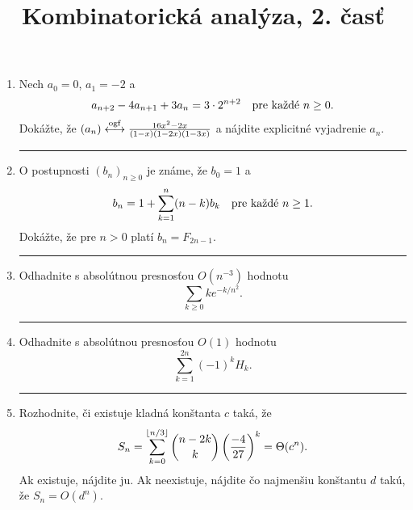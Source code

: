\documentclass[a4paper, 12pt]{article}
\title{Kombinatorická analýza, 2. časť}
\date{}
\def\ogf{\overset{{\rm ogf}}{\longleftrightarrow}}
\begin{document}
\begin{enumerate}
\item
Nech $a_0=0$, $a_1=-2$ a
$$
a_{n+2} -4 a_{n+1}+3a_n = 3\cdot 2^{n+2} \quad\hbox{pre každé $n\ge 0$}.
$$
Dokážte, že $(a_n)\ogf {16x^2-2x\over (1-x)(1-2x)(1-3x)}$ a nájdite explicitné vyjadrenie $a_n$.
\medskip\hrule

\item
O postupnosti $(b_n)_{n\ge 0}$ je známe, že $b_0=1$ a
$$
b_n = 1 + \sum_{k=1}^n (n-k)b_k\quad\hbox{pre každé $n\ge 1$}.
$$
Dokážte, že pre $n>0$ platí $b_n = F_{2n-1}$.
\medskip\hrule

\item
Odhadnite s absolútnou presnosťou $O(n^{-3})$ hodnotu
$$
\sum_{k\ge 0} ke^{-k/n^2}.
$$
\medskip\hrule

\item
Odhadnite s absolútnou presnosťou $O(1)$ hodnotu
$$
\sum_{k=1}^{2n} (-1)^kH_k.
$$
\medskip\hrule

\item
Rozhodnite, či existuje kladná konštanta $c$ taká, že
$$
S_n = \sum_{k=0}^{\lfloor n/3\rfloor} {n-2k\choose k}\left({-4\over 27}\right)^k = \Theta(c^n).
$$
Ak existuje, nájdite ju. Ak neexistuje, nájdite čo najmenšiu konštantu $d$ takú, že $S_n = O(d^n)$.


\end{enumerate}
\end{document}
